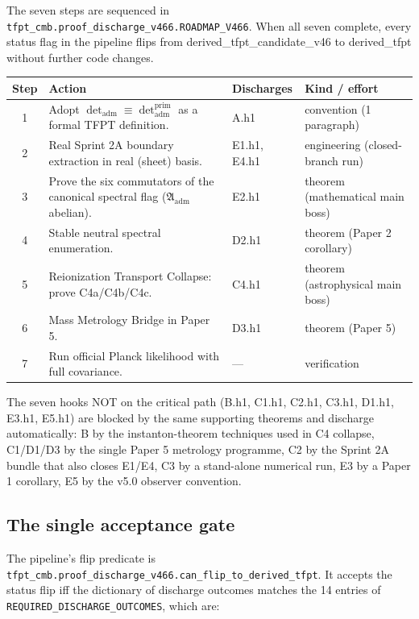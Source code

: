 \documentclass[11pt,a4paper]{article}
\begin{document}
The seven steps are sequenced in
\texttt{tfpt\_cmb.proof\_discharge\_v466.ROADMAP\_V466}.  When all
seven complete, every status flag in the pipeline flips from
\textsf{derived\_tfpt\_candidate\_v46} to \textsf{derived\_tfpt}
without further code changes.

\begin{center}
\renewcommand{\arraystretch}{1.18}
\begin{tabularx}{\textwidth}{@{}clp{}p{}@{}}
\toprule
\textbf{Step} & \textbf{Action} & \textbf{Discharges} & \textbf{Kind / effort} \\
\midrule
1 & Adopt \(\det_{\mathrm{adm}}\equiv\det_{\mathrm{adm}}^{\mathrm{prim}}\) as a formal TFPT definition. & A.h1 & convention (1 paragraph) \\
2 & Real Sprint 2A boundary extraction in real (sheet) basis. & E1.h1, E4.h1 & engineering (closed-branch run) \\
3 & Prove the six commutators of the canonical spectral flag (\(\mathfrak A_{\mathrm{adm}}\) abelian). & E2.h1 & theorem (mathematical main boss) \\
4 & Stable neutral spectral enumeration. & D2.h1 & theorem (Paper 2 corollary) \\
5 & Reionization Transport Collapse: prove C4a/C4b/C4c. & C4.h1 & theorem (astrophysical main boss) \\
6 & Mass Metrology Bridge in Paper 5. & D3.h1 & theorem (Paper 5) \\
7 & Run official Planck likelihood with full covariance. & --- & verification \\
\bottomrule
\end{tabularx}
\end{center}

The seven hooks NOT on the critical path
(B.h1, C1.h1, C2.h1, C3.h1, D1.h1, E3.h1, E5.h1) are blocked by the
same supporting theorems and discharge automatically: B by the
instanton-theorem techniques used in C4 collapse, C1/D1/D3 by the
single Paper 5 metrology programme, C2 by the Sprint 2A bundle that
also closes E1/E4, C3 by a stand-alone numerical run, E3 by a Paper
1 corollary, E5 by the v5.0 observer convention.

\subsection{The single acceptance gate}

The pipeline's flip predicate is
\texttt{tfpt\_cmb.proof\_discharge\_v466.can\_flip\_to\_derived\_tfpt}.
It accepts the status flip iff the dictionary of discharge outcomes
matches the 14 entries of
\texttt{REQUIRED\_DISCHARGE\_OUTCOMES}, which are:
\end{document}
